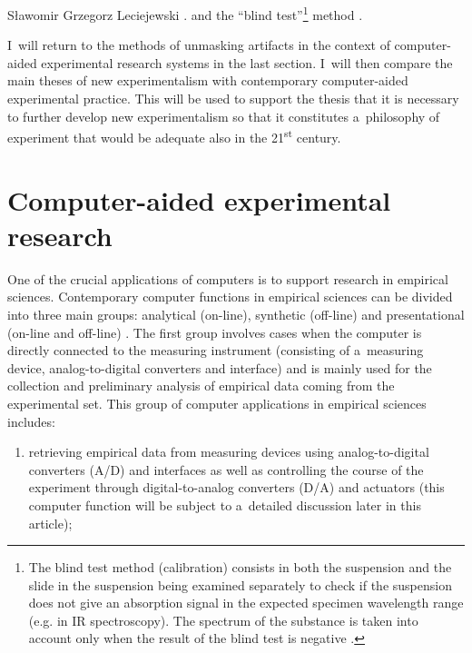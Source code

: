 \begin{artengenv}{Sławomir Grzegorz Leciejewski}
{%
\parencite[][]{churchland_we_1985}.%
} and the ``blind test''\footnote{The blind test method (calibration) consists in both the suspension and the slide in the suspension being examined separately to check if the suspension does not give an absorption signal in the expected specimen wavelength range (e.g. in IR spectroscopy). The spectrum of the substance is taken into account only when the result of the blind test is negative 
\parencite[][]{franklin_neglect_1986}.%
} method 
\parencite[][pp.145–151]{churchland_we_1985}.%




I~will return to the methods of unmasking artifacts in the context of computer-aided experimental research systems in the last section. I~will then compare the main theses of new experimentalism with contemporary computer-aided experimental practice. This will be used to support the thesis that it is necessary to further develop new experimentalism so that it constitutes a~philosophy of experiment that would be adequate also in the 21\textsuperscript{st} century.



\section*{Computer-aided experimental research }

One of the crucial applications of computers is to support research in empirical sciences. Contemporary computer functions in empirical sciences can be divided into three main groups: analytical (on-line), synthetic (off-line) and presentational (on-line and off-line) 
\parencites[][]{leciejewski_preface_2019}[][]{leciejewski_struktura_2018}. %
 The first group involves cases when the computer is directly connected to the measuring instrument (consisting of a~measuring device, analog-to-digital converters and interface) and is mainly used for the collection and preliminary analysis of empirical data coming from the experimental set. This group of computer applications in empirical sciences includes:



\begin{enumerate}

\item retrieving empirical data from measuring devices using analog-to-digital converters (A/D) and interfaces as well as controlling the course of the experiment through digital-to-analog converters (D/A) and actuators (this computer function will be subject to a~detailed discussion later in this article);


\end{enumerate}
\end{artengenv}
